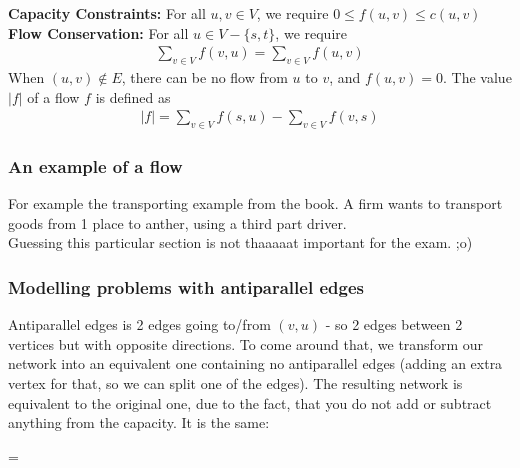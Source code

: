 \documentclass[12pt,a4paper]{article}
\begin{document}
\textbf{Capacity Constraints:} For all $u, v \in V$, we require $0 \leq f(u, v) \leq c(u, v)$\\
\textbf{Flow Conservation:} For all $u \in V - \{s, t\}$, we require
\begin{align}
\sum_{v \in V} f(v, u) = \sum_{v \in V} f(u, v)
\end{align}
When $(u, v) \notin E$, there can be no flow from $u$ to $v$, and $f(u, v) = 0$. The value $|f|$ of a flow $f$ is defined as 
\begin{align}
|f| = \sum_{v \in V} f(s, u) - \sum_{v \in V} f(v, s)
\end{align}
\subsubsection{An example of a flow}
For example the transporting example from the book. A firm wants to transport goods from 1 place to anther, using a third part driver. \\

Guessing this particular section is not thaaaaat important for the exam. ;o)

\subsubsection{Modelling problems with antiparallel edges}
Antiparallel edges is 2 edges going to/from $(v, u)$ - so 2 edges between 2 vertices but with opposite directions. To come around that, we transform our network into an equivalent one containing no antiparallel edges (adding an extra vertex for that, so we can split one of the edges). The resulting network is equivalent to the original one, due to the fact, that you do not add or subtract anything from the capacity. It is the same:\\

\begin{minipage}{.5\textwidth}
\centering
{} 
\end{minipage}%
=
\begin{minipage}{.5\textwidth}
\centering
{} 
\end{minipage}
\end{document}
